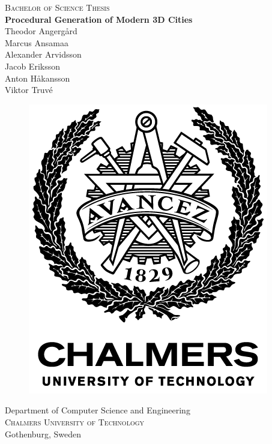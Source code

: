 \newpage
\thispagestyle{empty}
\begin{center}
  \textsc{\large Bachelor of Science Thesis \the\year}\\[4cm]		%
  \textbf{\Large Procedural Generation of Modern 3D Cities} \\[1cm]
  {\Large
    Theodor Angergård \\[0.1cm]
    Marcus Ansamaa \\[0.1cm]
    Alexander Arvidsson \\[0.1cm]
    Jacob Eriksson \\[0.1cm]
    Anton Håkansson \\[0.1cm]
    Viktor Truvé \\[0.1cm]
  }    
  \vfill	

  \begin{figure}[H]
    \centering
    \includegraphics[width=0.2\pdfpagewidth]{figure/chalmers.png} \\	
  \end{figure}	\vspace{5mm}	
  
  Department of Computer Science and Engineering \\
  \textsc{Chalmers University of Technology} \\
  Gothenburg, Sweden \the\year \\
\end{center}


